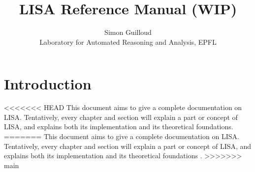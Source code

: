 \documentclass[11pt,a4paper]{book}
\title{LISA Reference Manual (WIP)}
\author{Simon Guilloud\\Laboratory for Automated Reasoning and Analysis, EPFL}
\date{}
\theoremstyle{definition}
\begin{document}
\maketitle
\chapter*{Introduction}
<<<<<<< HEAD
This document aims to give a complete documentation on LISA. Tentatively, every chapter and section will explain a part or concept of LISA, and explains both its implementation and its theoretical foundations.
=======
This document aims to give a complete documentation on LISA. Tentatively, every chapter and section will explain a part or concept of LISA, and explains both its implementation and its theoretical foundations \cite{DBLP:conf/tacas/GuilloudK22}.
>>>>>>> main







\end{document}
